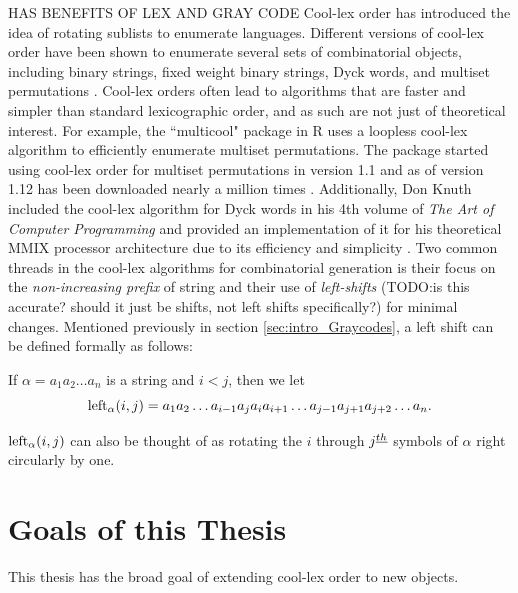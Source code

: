 HAS BENEFITS OF LEX AND GRAY CODE
Cool-lex order has introduced the idea of rotating sublists to enumerate languages.  Different versions of cool-lex order have been shown to enumerate several sets of combinatorial objects, including binary strings, fixed weight binary strings, Dyck words, and multiset permutations \cite{williams2009shift}.  Cool-lex orders often lead to algorithms that are faster and simpler than standard lexicographic order, and as such are not just of theoretical interest.  For example, the ``multicool" package in R uses a loopless cool-lex algorithm to efficiently enumerate multiset permutations.   The package started using cool-lex order for multiset permutations in version 1.1 and as of version 1.12 has been downloaded nearly a million times \cite{multicool_2021}.  Additionally, Don Knuth included the cool-lex algorithm for Dyck words in his 4th volume of \emph{The Art of Computer Programming} and provided an implementation of it for his theoretical MMIX processor architecture due to its efficiency and simplicity \cite{knuth2015art}.
Two common threads in the cool-lex algorithms for combinatorial generation is their focus on the \emph{non-increasing prefix} of string and their use of \emph{left-shifts} (TODO:is this accurate? should it just be shifts, not left shifts specifically?) for minimal changes.  Mentioned previously in section \ref{sec:intro_Graycodes}, a left shift can be defined formally as follows:

If $\alpha = a_1 a_2 \ldots a_n$ is a string and $i < j$, then we let
\begin{equation}
    \lshiftindex[\alpha]{i}{j} = a_1 a_2 \ldots a_{i-1} a_j a_{i} a_{i+1} \ldots a_{j-1} a_{j+1} a_{j+2} \ldots a_n. \label{eq:leftdef}
\end{equation}

$\lshiftindex[\alpha]{i}{j}$ can also be thought of as rotating the $i$ through $j\thh$ symbols of $\alpha$ right circularly by one.


\section{Goals of this Thesis}


This thesis has the broad goal of extending cool-lex order to new objects.

